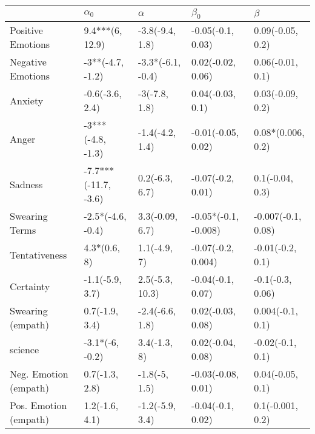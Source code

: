 \begin{tabular}{lllll}
\toprule
{} &            $\alpha_0$ &           $\alpha$ &             $\beta_0$ &             $\beta$ \\
\midrule
Positive Emotions     &       9.4***(6, 12.9) &    -3.8(-9.4, 1.8) &     -0.05(-0.1, 0.03) &    0.09(-0.05, 0.2) \\
Negative Emotions     &      -3**(-4.7, -1.2) &  -3.3*(-6.1, -0.4) &     0.02(-0.02, 0.06) &    0.06(-0.01, 0.1) \\
Anxiety               &       -0.6(-3.6, 2.4) &      -3(-7.8, 1.8) &      0.04(-0.03, 0.1) &    0.03(-0.09, 0.2) \\
Anger                 &     -3***(-4.8, -1.3) &    -1.4(-4.2, 1.4) &    -0.01(-0.05, 0.02) &   0.08*(0.006, 0.2) \\
Sadness               &  -7.7***(-11.7, -3.6) &     0.2(-6.3, 6.7) &     -0.07(-0.2, 0.01) &     0.1(-0.04, 0.3) \\
Swearing Terms        &     -2.5*(-4.6, -0.4) &    3.3(-0.09, 6.7) &  -0.05*(-0.1, -0.008) &  -0.007(-0.1, 0.08) \\
Tentativeness         &          4.3*(0.6, 8) &       1.1(-4.9, 7) &    -0.07(-0.2, 0.004) &    -0.01(-0.2, 0.1) \\
Certainty             &       -1.1(-5.9, 3.7) &    2.5(-5.3, 10.3) &     -0.04(-0.1, 0.07) &    -0.1(-0.3, 0.06) \\
Swearing (empath)     &        0.7(-1.9, 3.4) &    -2.4(-6.6, 1.8) &     0.02(-0.03, 0.08) &    0.004(-0.1, 0.1) \\
science               &       -3.1*(-6, -0.2) &       3.4(-1.3, 8) &     0.02(-0.04, 0.08) &    -0.02(-0.1, 0.1) \\
Neg. Emotion (empath) &        0.7(-1.3, 2.8) &      -1.8(-5, 1.5) &    -0.03(-0.08, 0.01) &    0.04(-0.05, 0.1) \\
Pos. Emotion (empath) &        1.2(-1.6, 4.1) &    -1.2(-5.9, 3.4) &     -0.04(-0.1, 0.02) &    0.1(-0.001, 0.2) \\
\bottomrule
\end{tabular}
